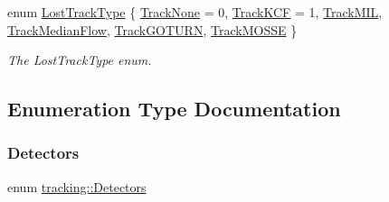 \begin{DoxyCompactItemize}
enum \mbox{\hyperlink{namespacetracking_a5377d69122ad915004ef68a518d22be3}{Lost\+Track\+Type}} \{ \newline
\mbox{\hyperlink{namespacetracking_a5377d69122ad915004ef68a518d22be3a3bd92892a83828375b9fce502732c491}{Track\+None}} = 0, 
\mbox{\hyperlink{namespacetracking_a5377d69122ad915004ef68a518d22be3a9bba8e4377e562caa976576d47c5eb2e}{Track\+K\+CF}} = 1, 
\mbox{\hyperlink{namespacetracking_a5377d69122ad915004ef68a518d22be3a98b9586c66bb9e4b1e0fed027700a197}{Track\+M\+IL}}, 
\mbox{\hyperlink{namespacetracking_a5377d69122ad915004ef68a518d22be3a637634260348d3b28ff4e28661bb417a}{Track\+Median\+Flow}}, 
\newline
\mbox{\hyperlink{namespacetracking_a5377d69122ad915004ef68a518d22be3a674ec8effe560545c87b0c14bd40f7f3}{Track\+G\+O\+T\+U\+RN}}, 
\mbox{\hyperlink{namespacetracking_a5377d69122ad915004ef68a518d22be3aa3948447c2ea9d8e9efef9b9433c70e2}{Track\+M\+O\+S\+SE}}
 \}
\begin{DoxyCompactList}\small\item\em The Lost\+Track\+Type enum. \end{DoxyCompactList}\end{DoxyCompactItemize}


\subsection{Enumeration Type Documentation}
\mbox{\label{namespacetracking_a1edf574df68abf048988b7cbacc52760}} 
\subsubsection{\texorpdfstring{Detectors}{Detectors}}
{\footnotesize\ttfamily enum \mbox{\hyperlink{namespacetracking_a1edf574df68abf048988b7cbacc52760}{tracking\+::\+Detectors}}}

